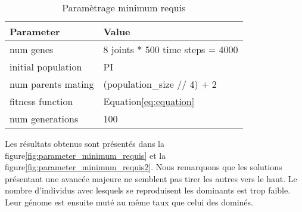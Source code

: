 \documentclass[journal, a4paper]{IEEEtran}
\begin{document}
	\begin{table}[!hbt]
		\begin{center}
		\caption{Paramètrage minimum requis}
		\label{tab:Parametrage_minimum_requis}
		\begin{tabular}{|l|l|}
			\hline
			\textbf{Parameter} & \textbf{Value} \\
			\hline
			num genes & 8 joints * 500 time steps = 4000 \\
			\hline
			initial population & PI \\
			\hline
			num parents mating & (population\_size // 4) + 2 \\
			\hline
			fitness function & Equation\ref{eq:equation} \\
			\hline
			num generations & 100 \\
			\hline
			\end{tabular}
		\end{center}
	\end{table}
	Les résultats obtenus sont présentés dans la figure\ref{fig:parameter_minimum_requis}
	et la figure\ref{fig:parameter_minimum_requis2}.
	Nous remarquons que les solutions présentant une avancée majeure
	ne semblent pas tirer les autres vers le haut.
	Le nombre d'individus avec lesquels se reproduisent les dominants
	est trop faible. Leur génome est ensuite muté au même taux que celui
	des dominés.

\end{document}
